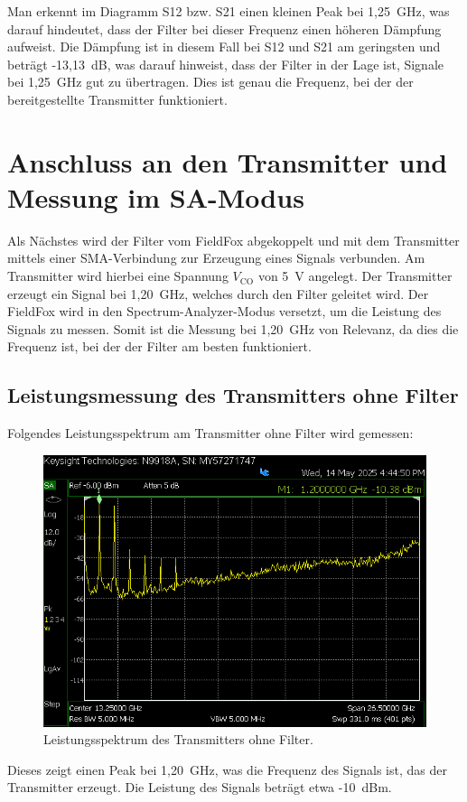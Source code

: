     Man erkennt im Diagramm S12 bzw. S21 einen kleinen Peak bei 1,25~GHz, was darauf hindeutet, dass der Filter bei dieser Frequenz einen höheren Dämpfung aufweist. Die Dämpfung ist in diesem Fall bei S12 und S21 am geringsten und beträgt -13,13~dB, was darauf hinweist, dass der Filter in der Lage ist, Signale bei 1,25~GHz gut zu übertragen.
    Dies ist genau die Frequenz, bei der der bereitgestellte Transmitter funktioniert.
\section{Anschluss an den Transmitter und Messung im SA-Modus}
    Als Nächstes wird der Filter vom FieldFox abgekoppelt und mit dem Transmitter mittels einer SMA-Verbindung zur Erzeugung eines Signals verbunden. Am Transmitter wird hierbei eine Spannung $V_\mathrm{CO}$ von 5~V angelegt.
    Der Transmitter erzeugt ein Signal bei 1,20~GHz, welches durch den Filter geleitet wird. Der FieldFox wird in den Spectrum-Analyzer-Modus versetzt, um die Leistung des Signals zu messen. 
    Somit ist die Messung bei 1,20~GHz von Relevanz, da dies die Frequenz ist, bei der der Filter am besten funktioniert.

    \subsection{Leistungsmessung des Transmitters ohne Filter}
    Folgendes Leistungsspektrum am Transmitter ohne Filter wird gemessen:
    \begin{figure}[H]
        \centering
        \includegraphics[width=0.6\linewidth]{Pictures/SA-TranceiverohnegutFIlterPeakCooleGrupp.png}
        \caption{Leistungsspektrum des Transmitters ohne Filter.}
        \label{fig:transmitter_spectrum_without_filter}
    \end{figure}
    Dieses zeigt einen Peak bei 1,20~GHz, was die Frequenz des Signals ist, das der Transmitter erzeugt. Die Leistung des Signals beträgt etwa -10~dBm.

